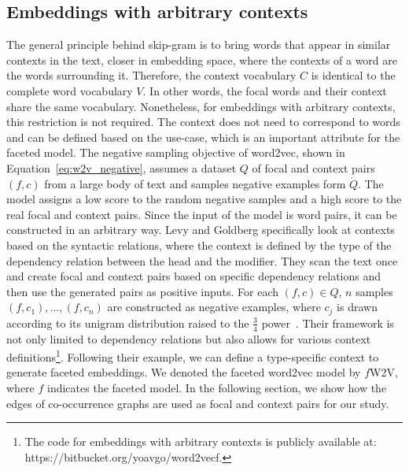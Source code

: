 \subsection{Embeddings with arbitrary contexts}
The general principle behind skip-gram is to bring words that appear in similar contexts in the text, closer in embedding space, where the contexts of a word are the words surrounding it. Therefore, the context vocabulary $C$ is identical to the complete word vocabulary $V$. In other words, the focal words and their context share the same vocabulary. Nonetheless, for embeddings with arbitrary contexts, this restriction is not required. The context does not need to correspond to words and can be defined based on the use-case, which is an important attribute for the faceted model. The negative sampling objective of word2vec, shown in Equation~\ref{eq:w2v_negative}, assumes a dataset $Q$ of focal and context pairs $(f,c)$ from a large body of text and samples negative examples form $\acute{Q}$. The model assigns a low score to the random negative samples and a high score to the real focal and context pairs. Since the input of the model is word pairs, it can be constructed in an arbitrary way. Levy and Goldberg specifically look at contexts based on the syntactic relations, where the context is defined by the type of the dependency relation between the head and the modifier. They scan the text once and create focal and context pairs based on specific dependency relations and then use the generated pairs as positive inputs. For each $(f,c) \in Q$, $n$ samples $(f,c_1),\dots,(f,c_n)$ are constructed as negative examples, where $c_j$ is drawn according to its unigram distribution raised to the $\frac{3}{4}$ power~. Their framework is not only limited to dependency relations but also allows for various context definitions\footnote{The code for embeddings with arbitrary contexts is publicly available at: https://bitbucket.org/yoavgo/word2vecf.}. Following their example, we can define a type-specific context to generate faceted embeddings. We denoted the faceted word2vec model by $f$W2V, where $f$ indicates the faceted model. In the following section, we show how the edges of co-occurrence graphs are used as focal and context pairs for our study. 
